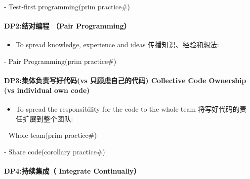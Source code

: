 \begin{description}
\tightlist
\item[]
- Test-first programming(prim practice\#)
\end{description}

\hypertarget{dp2ux7ed3ux5bf9ux7f16ux7a0b-pair-programming}{%
\paragraph{DP2:结对编程 （Pair
Programming）}\label{dp2ux7ed3ux5bf9ux7f16ux7a0b-pair-programming}}

\begin{itemize}
\tightlist
\item
  To spread knowledge, experience and ideas 传播知识、经验和想法:\\
\end{itemize}

\begin{description}
\tightlist
\item[]
- Pair Programming(prim practice\#)
\end{description}

\hypertarget{dp3ux96c6ux4f53ux8d1fux8d23ux5199ux597dux4ee3ux7801vs-ux53eaux987eux8651ux81eaux5df1ux7684ux4ee3ux7801-collective-code-ownership-vs-individual-own-code}{%
\paragraph{DP3:集体负责写好代码(vs 只顾虑自己的代码) Collective Code
Ownership (vs individual own
code)}\label{dp3ux96c6ux4f53ux8d1fux8d23ux5199ux597dux4ee3ux7801vs-ux53eaux987eux8651ux81eaux5df1ux7684ux4ee3ux7801-collective-code-ownership-vs-individual-own-code}}

\begin{itemize}
\tightlist
\item
  To spread the responsibility for the code to the whole team
  将写好代码的责任扩展到整个团队:\\
\end{itemize}

\begin{description}
\tightlist
\item[]
- Whole team(prim practice\#)

- Share code(corollary practice\#)
\end{description}

\hypertarget{dp4ux6301ux7eedux96c6ux6210-integrate-continually}{%
\paragraph{DP4:持续集成（ Integrate
Continually）}\label{dp4ux6301ux7eedux96c6ux6210-integrate-continually}}

